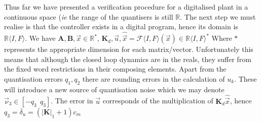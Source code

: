 \documentclass[runningheads,a4paper]{llncs}
\newcommand{\mat}[1]{\boldsymbol{#1}}
\begin{document}

Thus far we have presented a verification procedure for a digitalised plant in a continuous space (\emph{ie} the
range of the quantisers is still $\mathbb{R}$. The next step we must realise is that the controller 
exists in a digital program, hence its domain is $\mathbb{R}\langle I,F\rangle$. We have $\mat{A},\mat{B},\vec{x} \in \mathbb{R}^*$, $\mat{K}_d,\vec{u},\hat{\vec{x}}=\mathcal{F}\langle I,F \rangle(\vec{x}) \in \mathbb{R}\langle I,F\rangle^*$
Where $*$ represents the appropriate dimension for each matrix/vector.
Unfortunately this means that although the closed loop dynamics are in the reals, they suffer from
the fixed word restrictions in their composing elements.
Apart from the quantisation errors $q_1,q_2$ there are rounding errors in the calculation of $u_k$. 
These will introduce a new source of quantisation noise which we may denote $\vec{\nu}_3 \in [-q_3\ \ q_3]$.
The error in $\vec{u}$ corresponds of the multiplication of $\mat{K}_d\hat{\vec{x}}$, hence $q_3=\overline{\delta}_u=(|\mat{K}|_1+1)c_m$






\end{document}
